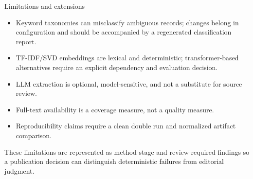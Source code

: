 \documentclass[
  ignorenonframetext,
]{beamer}
\providecommand{\tightlist}{%
  \setlength{\itemsep}{0pt}\setlength{\parskip}{0pt}}
\begin{document}
\begin{frame}[allowframebreaks]{Limitations and extensions}
\label{limitations-and-extensions}
\begin{itemize}
\tightlist
\item
  Keyword taxonomies can misclassify ambiguous records; changes belong
  in configuration and should be accompanied by a regenerated
  classification report.
\item
  TF-IDF/SVD embeddings are lexical and deterministic; transformer-based
  alternatives require an explicit dependency and evaluation decision.
\item
  LLM extraction is optional, model-sensitive, and not a substitute for
  source review.
\item
  Full-text availability is a coverage measure, not a quality measure.
\item
  Reproducibility claims require a clean double run and normalized
  artifact comparison.
\end{itemize}

These limitations are represented as method-stage and review-required
findings so a publication decision can distinguish deterministic
failures from editorial judgment.
\end{frame}
\end{document}
